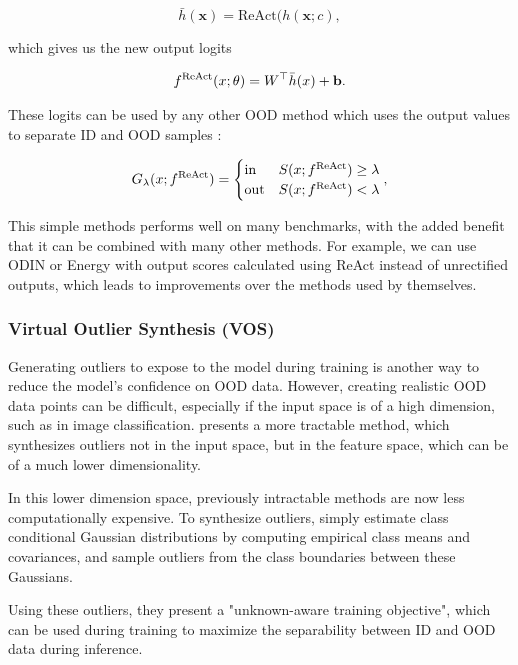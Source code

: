 \documentclass[conference,onecolumn]{IEEEtran}
\begin{document}
\begin{equation}\label{dog}
  \bar{h}(\bm{x}) = \text{ReAct}(h(\bm{x}; c),
\end{equation}

which gives us the new output logits 

\begin{align}
f^{\text{ReAct}}(\*x;\theta) = \*W^\top \bar h(\*x) + \mathbf{b}.
\end{align}

These logits can be used by any other OOD method which uses the output values to separate ID and OOD samples \cite{react}:

\begin{align}
\label{eq:threshold}
	G_{\lambda}(\*x; f^\text{ReAct})=\begin{cases} 
      \text{in } & S(\*x;f^\text{ReAct})\ge \lambda \\
      \text{out} & S(\*x;f^\text{ReAct}) < \lambda 
   \end{cases},
\end{align}

This simple methods performs well on many benchmarks, with the added benefit that it can be combined with many other methods. For example, we can use ODIN or Energy with output scores calculated using ReAct instead of unrectified outputs, which leads to improvements over the methods used by themselves.
\\

\subsubsection{Virtual Outlier Synthesis (VOS)}

Generating outliers to expose to the model during training is another way to reduce the model's confidence on OOD data. However, creating realistic OOD data points can be difficult, especially if the input space is of a high dimension, such as in image classification. \cite{vos} presents a more tractable method, which synthesizes outliers not in the input space, but in the feature space, which can be of a much lower dimensionality.

In this lower dimension space, previously intractable methods are now less computationally expensive. To synthesize outliers, \cite{vos} simply estimate class conditional Gaussian distributions by computing empirical class means and covariances, and sample outliers from the class boundaries between these Gaussians.

Using these outliers, they present a "unknown-aware training objective", which can be used during training to maximize the separability between ID and OOD data during inference.
\\
\end{document}
